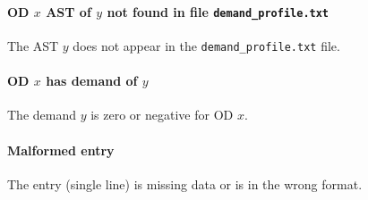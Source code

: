 \paragraph*{OD $x$ AST of $y$ not found in file \texttt{demand\_profile.txt}}
The AST $y$ does not appear in the \texttt{demand\_profile.txt} file.

\paragraph*{OD $x$ has demand of $y$}
The demand $y$ is zero or negative for OD $x$.

\paragraph*{Malformed entry}
The entry (single line) is missing data or is in the wrong format.